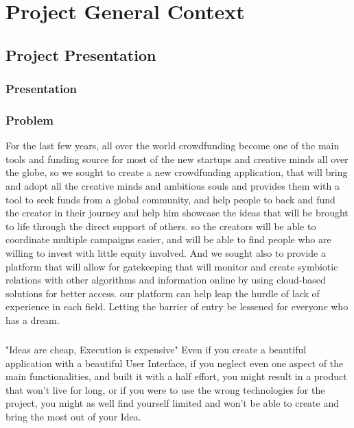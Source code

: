 

\setcounter{mtc}{7}
\chapter{Project General Context }%
\label{chap:chapter_one}
\minitoc
\section{ Project Presentation }
\subsection{Presentation}
\subsection{Problem}
For the last few years, all over the world crowdfunding become one of the main tools and funding source for most of the new startups and creative minds all over the globe,
so we sought to create a new crowdfunding application, that will bring and adopt all the creative minds and ambitious souls and provides them with a tool to seek funds from a global community,
and help people to back and fund the creator in their journey and help him showcase the ideas that will be brought to life through the direct support of others.
so the creators will be able to coordinate multiple campaigns easier, and will be able to find people who are willing to invest with little equity involved.
And we sought also to provide a platform that will allow for gatekeeping that will monitor and create symbiotic relations with other algorithms and information online by using cloud-based solutions for better access.
our platform can help leap the hurdle of lack of experience in each field. Letting the barrier of entry be lessened for everyone who has a dream.
\paragraph*{}
"Ideas are cheap, Execution is expensive" Even if you create a beautiful application with a beautiful User Interface, if you neglect even one aspect of the main functionalities, and built it with a half effort, you might result in a product that won't live for long, or if you were to use the wrong technologies for the project, you might as well find yourself limited and won't be able to create and bring the most out of your Idea.
